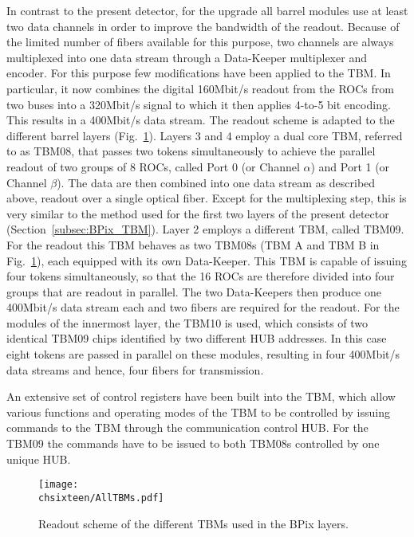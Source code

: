 In contrast to the present detector, for the upgrade all barrel modules use at least two data channels in order to improve the bandwidth of the readout.
Because of the limited number of fibers available for this purpose, two channels are always multiplexed into one data stream through a Data-Keeper multiplexer and encoder.
For this purpose few modifications have been applied to the TBM.
In particular, it now combines the digital 160\unit{Mbit/s} readout from the ROCs from two buses into a 320\unit{Mbit/s} signal to which it then applies 4-to-5 bit encoding. This results in a 400\unit{Mbit/s} data stream.
The readout scheme is adapted to the different barrel layers (Fig.~\ref{fig:Phase1TBMRO}).
Layers 3 and 4 employ a dual core TBM, referred to as TBM08, that passes two tokens simultaneously to achieve the parallel readout of two groups of 8 ROCs, called Port 0 (or Channel $\alpha$) and Port 1 (or Channel $\beta$). 
The data are then combined into one data stream as described above, readout over a single optical fiber. Except for the multiplexing step, this is very similar to the method used for the first two layers of the present detector (Section~\ref{subsec:BPix_TBM}).
Layer 2 employs a different TBM, called TBM09. For the readout this TBM behaves as two TBM08s (TBM A and TBM B in Fig.~\ref{fig:Phase1TBMRO}), each equipped with its own Data-Keeper. This TBM is capable of issuing four tokens simultaneously, so that the 16 ROCs are therefore divided into four groups that are readout in parallel. The two Data-Keepers then produce one 400\unit{Mbit/s} data stream each and two fibers are required for the readout.
For the modules of the innermost layer, the TBM10 is used, which consists of two identical TBM09 chips identified by two different HUB addresses. In this case eight tokens are passed in parallel on these modules, resulting in four 400\unit{Mbit/s} data streams and hence, four fibers for transmission.

An extensive set of control registers have been built into the TBM, which allow various functions and operating modes of the TBM to be controlled by issuing commands to the TBM through the communication control HUB.
For the TBM09 the commands have to be issued to both TBM08s controlled by one unique HUB.

\begin{figure}[!htb]
 \begin{center}
 \texttt{[image: \\chsixteen/AllTBMs.pdf]}
 \end{center}
 \caption{Readout scheme of the different TBMs used in the BPix layers.}
 \label{fig:Phase1TBMRO}
\end{figure}

